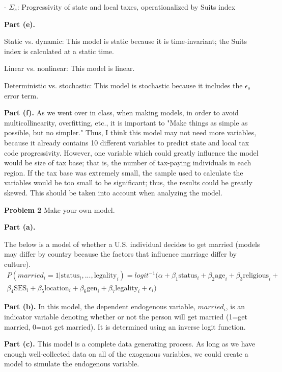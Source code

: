 \documentclass[letterpaper,12pt]{article}
\theoremstyle{definition}
\begin{document}
- $\Sigma_{s}$: Progressivity of state and local taxes, operationalized by Suits index


\textbf{Part (e).}

Static vs. dynamic: This model is static because it is time-invariant; the Suits index is calculated at a static time. 

Linear vs. nonlinear: This model is linear.

Deterministic vs. stochastic: This model is stochastic because it includes the $\epsilon_s$ error term.

\textbf{Part (f).}
As we went over in class, when making models, in order to avoid multicollinearity, overfitting, etc., it is important to "Make things as simple as possible, but no simpler." Thus, I think this model may not need more variables, because it already contains 10 different variables to predict state and local tax code progressivity. However, one variable which could greatly influence the model would be size of tax base; that is, the number of tax-paying individuals in each region. If the tax base was extremely small, the sample used to calculate the variables would be too small to be significant; thus, the results could be greatly skewed. This should be taken into account when analyzing the model.

\vspace{5mm}

\noindent\textbf{Problem 2} Make your own model.

\textbf{Part (a).} 

The below is a model of whether a U.S. individual decides to get married (models may differ by country because the factors that influence marriage differ by culture).
\begin{multline}
  P(married_{i} = 1 | \text{status}_i, ... , \text{legality}_i) = logit^{-1}(\alpha + \beta_{1} \text{status}_i + \beta_{2} \text{age}_i + \beta_{3} \text{religious}_i + \\
  \beta_{4} \text{SES}_i + \beta_{5} \text{location}_i + \beta_{6} \text{gen}_i + \beta_{7} \text{legality}_i +\epsilon_{i}) 
\end{multline}

\textbf{Part (b).} In this model, the dependent endogenous variable, $married_i$, is an indicator variable denoting whether or not the person will get married (1=get married, 0=not get married). It is determined using an inverse logit function. 

\textbf{Part (c).} This model is a complete data generating process. As long as we have enough well-collected data on all of the exogenous variables, we could create a model to simulate the endogenous variable.
\end{document}
